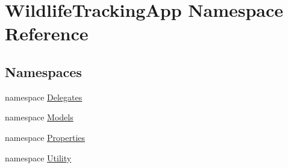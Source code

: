 \hypertarget{namespaceWildlifeTrackingApp}{}\section{Wildlife\+Tracking\+App Namespace Reference}
\label{namespaceWildlifeTrackingApp}
\subsection*{Namespaces}
\begin{DoxyCompactItemize}
\item 
namespace \hyperlink{namespaceWildlifeTrackingApp_1_1Delegates}{Delegates}
\item 
namespace \hyperlink{namespaceWildlifeTrackingApp_1_1Models}{Models}
\item 
namespace \hyperlink{namespaceWildlifeTrackingApp_1_1Properties}{Properties}
\item 
namespace \hyperlink{namespaceWildlifeTrackingApp_1_1Utility}{Utility}
\end{DoxyCompactItemize}
